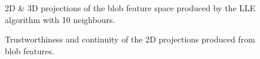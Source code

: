 \begin{figure}[H]
	\centering
	\caption{2D \& 3D projections of the blob feature space produced by the LLE algorithm with 10 neighbours.}\label{fig:blob_LLE_mapping}
\end{figure}
\clearpage

\clearpage
\begin{figure}[H]
	\centering
	\caption{Trustworthiness and continuity of the 2D projections produced from blob features.}\label{fig:TC_2d_blobs}
\end{figure}

